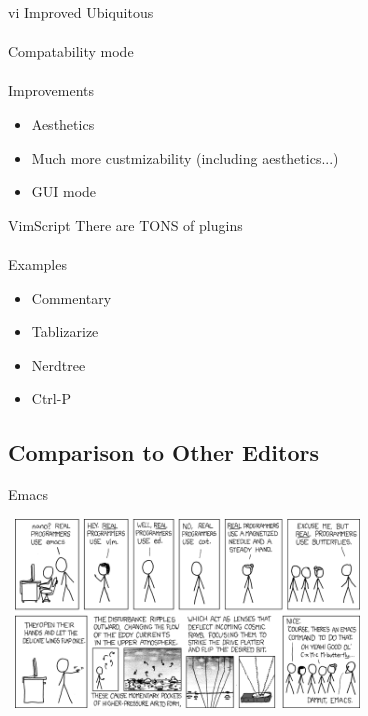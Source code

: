 \documentclass{beamer}
\begin{document}
            \begin{frame}{vi Improved}
                Ubiquitous \\~\\
                Compatability mode \\~\\
                Improvements
                \begin{itemize}
                    \item Aesthetics
                    \item Much more custmizability (including aesthetics...)
                    \item GUI mode
                \end{itemize}
            \end{frame}

            \begin{frame}{VimScript}
                There are TONS of plugins \\~\\
                Examples
                \begin{itemize}
                    \item Commentary
                    \item Tablizarize
                    \item Nerdtree
                    \item Ctrl-P
                \end{itemize}
            \end{frame}

        \subsection{Comparison to Other Editors}

            \begin{frame}{Emacs}
                \begin{center}
                \includegraphics[width = 9.5cm, height = 5cm]{images/real_programmers.png}
                \end{center}
            \end{frame}
\end{document}
